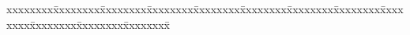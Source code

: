 
{\isamode
\begin{tabbing}
xxxxxxxx\=xxxxxxxx\=xxxxxxxx\=xxxxxxxx\=xxxxxxxx\=xxxxxxxx\=xxxxxxxx\=xxxxxxxx\=xxxxxxxx\=xxxxxxxx\=xxxxxxxx\=xxxxxxxx\=\kill{}\hspace{-1ex}

\end{tabbing}}

